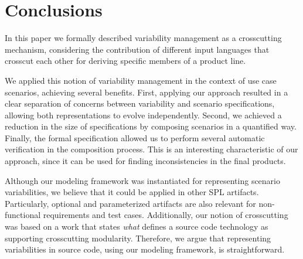 \section{Conclusions}\label{sec:conclusions}

In this paper we formally described variability management as a
crosscutting mechanism, considering the contribution
of different input languages that crosscut each other for deriving
specific members of a product line.

We applied this notion of variability management in the context of use
case scenarios, achieving several benefits. First, applying our approach resulted in
a clear separation of concerns between variability and scenario specifications,
allowing both representations to evolve independently. Second, we achieved a reduction
in the size of specifications by composing scenarios in a quantified way. Finally, the
formal specification allowed us to perform several automatic verification in the composition
process. This is an interesting characteristic of our approach, since it can be used
for finding inconsistencies in the final products.

Although our modeling framework was instantiated for representing
scenario variabilities, we believe that it could be applied in
other SPL artifacts. Particularly, optional and parameterized artifacts
are also relevant for non-functional requirements and test cases.
Additionally, our notion of crosscutting was based on a work that states \emph{what}
defines a source code technology as supporting crosscutting modularity. Therefore,
we argue that representing variabilities in source code, using our modeling framework,
is straightforward.

